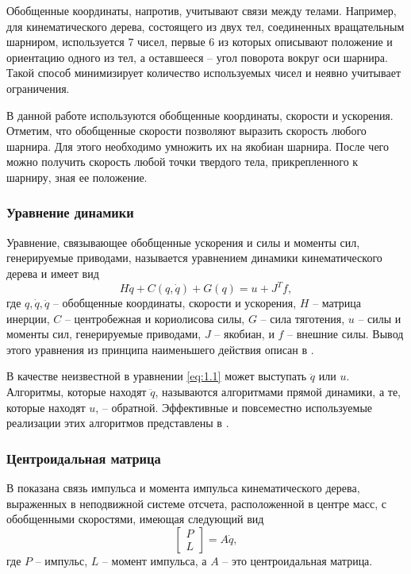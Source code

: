 Обобщенные координаты, напротив, учитывают связи между телами. Например, для кинематического дерева, состоящего из двух тел, соединенных вращательным шарниром, используется 7 чисел, первые 6 из которых описывают положение и ориентацию одного из тел, а оставшееся -- угол поворота вокруг оси шарнира. Такой способ минимизирует количество используемых чисел и неявно учитывает ограничения.

В данной работе используются обобщенные координаты, скорости и ускорения. Отметим, что обобщенные скорости позволяют выразить скорость любого шарнира. Для этого необходимо умножить их на якобиан шарнира. После чего можно получить скорость любой точки твердого тела, прикрепленного к шарниру, зная ее положение.

\subsubsection{Уравнение динамики}

Уравнение, связывающее обобщенные ускорения и силы и моменты сил, генерируемые приводами, называется уравнением динамики кинематического дерева и имеет вид
\begin{equation*}
  H \ddot{q} + C(q, \dot{q}) + G(q) = u + J^{T} f, \tag{1.1}\label{eq:1.1}
\end{equation*}
где $q, \dot{q}, \ddot{q}$ -- обобщенные координаты, скорости и ускорения, $H$ -- матрица инерции, $C$ -- центробежная и кориолисова силы, $G$ -- сила тяготения, $u$ -- силы и моменты сил, генерируемые приводами, $J$ -- якобиан, и $f$ -- внешние силы. Вывод этого уравнения из принципа наименьшего действия описан в \cite{Featherstone}.

В качестве неизвестной в уравнении \ref{eq:1.1} может выступать $\ddot{q}$ или $u$. Алгоритмы, которые находят $\ddot{q}$, называются алгоритмами прямой динамики, а те, которые находят $u$, -- обратной. Эффективные и повсеместно используемые реализации этих алгоритмов представлены в \cite{Featherstone}.

\subsubsection{Центроидальная матрица}

В \cite{OrinG} показана связь импульса и момента импульса кинематического дерева, выраженных в неподвижной системе отсчета, расположенной в центре масс, с обобщенными скоростями, имеющая следующий вид
\begin{equation*}
\begin{bmatrix} P\\ L \end{bmatrix} = A \dot{q}, \tag{1.2}\label{eq:1.2}
\end{equation*}
где $P$ -- импульс, $L$ -- момент импульса, а $A$ -- это центроидальная матрица.

